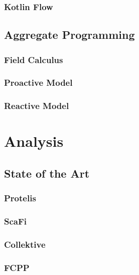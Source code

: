 \documentclass[12pt,a4paper,openright,twoside]{book}
\begin{document}
\subsection{Kotlin Flow}

\section{Aggregate Programming}

\subsection{Field Calculus}

\subsection{Proactive Model}


\subsection{Reactive Model}


\chapter{Analysis}
\label{chap:analysis}
\section{State of the Art}

\subsection{Protelis}

\subsection{ScaFi}

\subsection{Collektive}

\subsection{FCPP}
\end{document}
